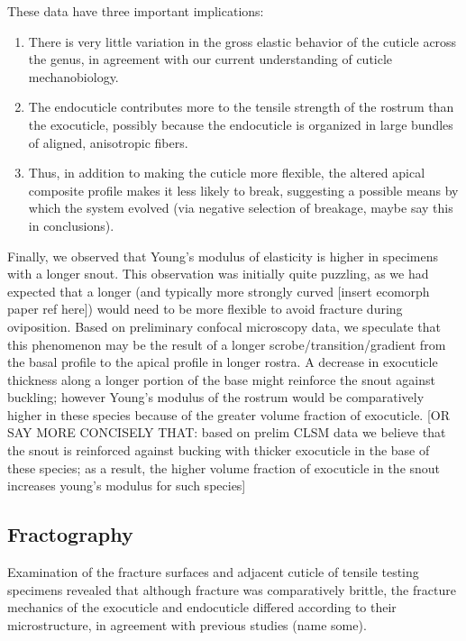 \documentclass[twocolumn, linenumbers, superscriptaddress]{revtex4-1}
\begin{document}
			These data have three important implications:
			\begin{enumerate}
				\item There is very little variation in the gross elastic behavior of the cuticle across the genus, in agreement with our current understanding of cuticle mechanobiology. 
				\item The endocuticle contributes more to the tensile strength of the rostrum than the exocuticle, possibly because the endocuticle is organized in large bundles of aligned, anisotropic fibers.
				\item Thus, in addition to making the cuticle more flexible, the altered apical composite profile makes it less likely to break, suggesting a possible means by which the system evolved (via negative selection of breakage, maybe say this in conclusions).
			\end{enumerate}
			
			Finally, we observed that Young's modulus of elasticity is higher in specimens with a longer snout.
			This observation was initially quite puzzling, as we had expected that a longer (and typically more strongly curved [insert ecomorph paper ref here]) would need to be more flexible to avoid fracture during oviposition.
			Based on preliminary confocal microscopy data, we speculate that this phenomenon may be the result of a longer scrobe/transition/gradient from the basal profile to the apical profile in longer rostra.
			A decrease in exocuticle thickness along a longer portion of the base might reinforce the snout against buckling; however Young's modulus of the rostrum would be comparatively higher in these species because of the greater volume fraction of exocuticle.
			[OR SAY MORE CONCISELY THAT: based on prelim CLSM data we believe that the snout is reinforced against bucking with thicker exocuticle in the base of these species; as a result, the higher volume fraction of exocuticle in the snout increases young's modulus for such species]
			
		\subsection{Fractography}
			Examination of the fracture surfaces and adjacent cuticle of tensile testing specimens revealed that although fracture was comparatively brittle, the fracture mechanics of the exocuticle and endocuticle differed according to their microstructure, in agreement with previous studies (name some).
			
\end{document}
